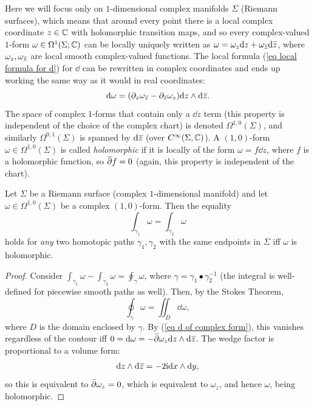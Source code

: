 \begin{rem}
    Here we will focus only on $1$-dimensional complex manifolds $\Sigma$ (Riemann surfaces), which means that around every point there is a local complex coordinate $z\in \mathbb{C}$ with holomorphic transition maps, and so every complex-valued $1$-form $\omega\in\Omega^1(\Sigma;\mathbb{C})$ can be locally uniquely written as $\omega=\omega_z \dd z+\omega_{\wb{z}} \dd \wb{z}$, where $\omega_z,\omega_{\wb{z}}$ are local smooth complex-valued functions.
    The local formula (\ref{eq local formula for d}) for $\dd$ can be rewritten in complex coordinates and ends up working the same way as it would in real coordinates:
    \[\dd\omega=(\partial_{z} \omega_{\wb z}-\partial_{\wb z} \omega_{z})\dd z\wedge \dd \wb{z}.\label{eq d of complex form}\]
    The space of complex $1$-forms that contain only a $\dd z$ term (this property is independent of the choice of the complex chart) is denoted $\Omega^{1,0}(\Sigma)$, and similarly $\Omega^{0,1}(\Sigma)$ is spanned by $\dd \wb{z}$ (over $C^\infty(\Sigma,\mathbb{C})$). A $(1,0)$-form $\omega\in\Omega^{1,0}(\Sigma)$ is called \emph{holomorphic} if it is locally of the form $\omega=f\dd z$, where $f$ is a holomorphic function, so $\wb\partial f=0$ (again, this property is independent of the chart).
\end{rem}
\begin{cor}
    Let $\Sigma$ be a Riemann surface (complex $1$-dimensional manifold) and let $\omega\in\Omega^{1,0}(\Sigma)$ be a complex $(1,0)$-form. Then the equality
    \[\int_{\gamma_1}\omega=\int_{\gamma_2}\omega\]
    holds for \emph{any} two homotopic paths $\gamma_1,\gamma_2$ with the same endpoints in $\Sigma$ iff $\omega$ is holomorphic.
\end{cor}
\begin{proof}
    Consider $\int_{\gamma_1}\omega-\int_{\gamma_2}\omega=\oint_{\gamma}\omega$, where $\gamma=\gamma_1\bullet \gamma_2^{-1}$ (the integral is well-defined for piecewise smooth paths as well). Then, by the Stokes Theorem, 
    \[\oint_\gamma \omega=\iint_D \dd\omega,\]
    where $D$ is the domain enclosed by $\gamma$.
    By (\ref{eq d of complex form}), this vanishes regardless of the contour iff $0=\dd \omega=-\wb\partial\omega_z \dd z\wedge\dd\wb{z}$. The wedge factor is proportional to a volume form:
    \[\dd z\wedge\dd {\wb z}=-2\i \dd x\wedge\dd y,\]
    so this is equivalent to $\wb\partial\omega_z=0$, which is equivalent to $\omega_z$, and hence $\omega$, being holomorphic.
\end{proof}

